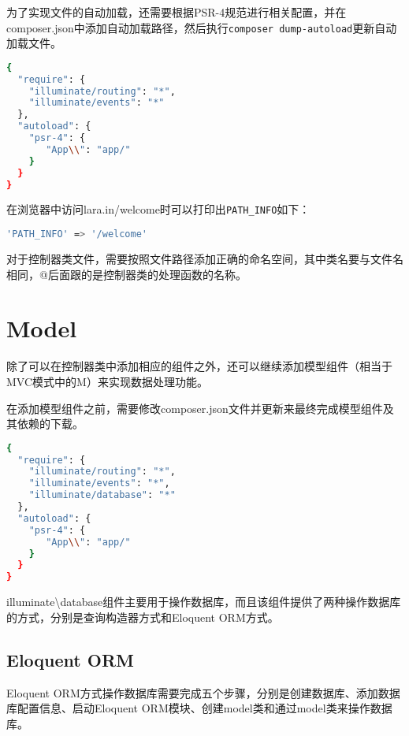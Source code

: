 为了实现文件的自动加载，还需要根据PSR-4规范进行相关配置，并在composer.json中添加自动加载路径，然后执行\texttt{composer dump-autoload}更新自动加载文件。




\begin{lstlisting}[language=bash]
{
  "require": {
    "illuminate/routing": "*",
    "illuminate/events": "*"
  },
  "autoload": {
    "psr-4": {
       "App\\": "app/"
    }
  }
}
\end{lstlisting}

在浏览器中访问lara.in/welcome时可以打印出\texttt{PATH\_INFO}如下：




\begin{lstlisting}[language=bash]
'PATH_INFO' => '/welcome'
\end{lstlisting}


对于控制器类文件，需要按照文件路径添加正确的命名空间，其中类名要与文件名相同，@后面跟的是控制器类的处理函数的名称。


\section{Model}

除了可以在控制器类中添加相应的组件之外，还可以继续添加模型组件（相当于MVC模式中的M）来实现数据处理功能。

在添加模型组件之前，需要修改composer.json文件并更新来最终完成模型组件及其依赖的下载。

\begin{lstlisting}[language=bash]
{
  "require": {
    "illuminate/routing": "*",
    "illuminate/events": "*",
    "illuminate/database": "*"
  },
  "autoload": {
    "psr-4": {
       "App\\": "app/"
    }
  }
}
\end{lstlisting}


illuminate\textbackslash database组件主要用于操作数据库，而且该组件提供了两种操作数据库的方式，分别是查询构造器方式和Eloquent ORM方式。

\subsection{Eloquent ORM}

Eloquent ORM方式操作数据库需要完成五个步骤，分别是创建数据库、添加数据库配置信息、启动Eloquent ORM模块、创建model类和通过model类来操作数据库。

